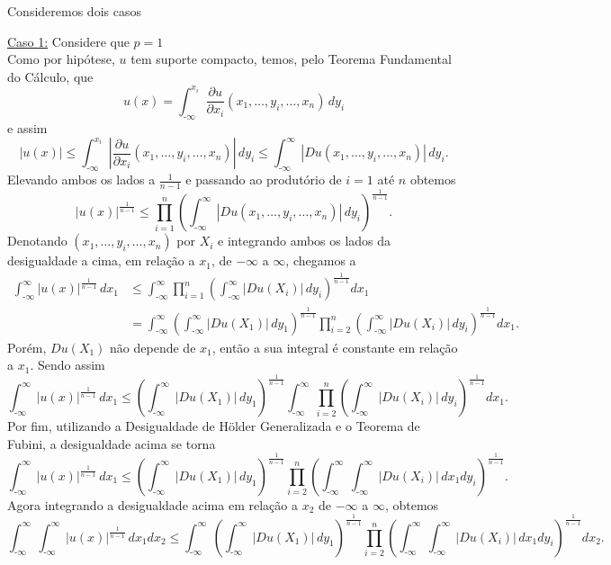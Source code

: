 \documentclass[a4paper, 11pt]{book}
\theoremstyle{definition}
\newcommand{\m}{\text{-}}
\begin{document}
\begin{prf}
    Consideremos dois casos

    \underline{Caso 1:} Considere que $p = 1$\\
    Como por hipótese, $u$ tem suporte compacto, temos, pelo Teorema Fundamental do Cálculo, que
    \[
        u(x) = \int_{\m\infty}^{x_i} \dfrac{\partial u}{\partial x_i}(x_1,\dots,y_i,\dots,x_n) \, dy_i
    \]
    e assim
    \[
        |u(x)| \leqslant \int_{\m\infty}^{x_i} \left|\dfrac{\partial u}{\partial x_i}(x_1,\dots,y_i,\dots,x_n)\right| \, dy_i  \leqslant \int_{\m\infty}^{\infty} \left| Du(x_1,\dots,y_i,\dots,x_n) \right| \,dy_i.
    \]
    Elevando ambos os lados a $\frac{1}{n-1}$ e passando ao produtório de $i = 1$ até $n$ obtemos
    \[
        |u(x)|^{\frac{1}{n-1}} \leqslant \prod_{i=1}^n \left( \int_{\m\infty}^{\infty} |Du(x_1,\dots,y_i,\dots,x_n)| \,dy_i \right)^{\frac{1}{n-1}}.
    \]
    Denotando $(x_1,\dots,y_i,\dots,x_n)$ por $X_i$ e integrando ambos os lados da desigualdade a cima, em relação a $x_1$, de $-\infty$ a $\infty$, chegamos a
    \[
        \begin{aligned}
            \int_{\m\infty}^{\infty} |u(x)|^{\frac{1}{n-1}} \,dx_1 &\leqslant \int_{\m\infty}^{\infty} \prod_{i=1}^n \left( \int_{\m\infty}^{\infty} |Du(X_i)| \,dy_i \right)^{\frac{1}{n-1}}  dx_1\\ 
            &= \int_{\m\infty}^{\infty} \left( \int_{\m\infty}^{\infty} |Du(X_1)| \,dy_1 \right)^{\frac{1}{n-1}}  \prod_{i=2}^n \left(\int_{\m\infty}^{\infty} |Du(X_i)| \, dy_i\right)^{\frac{1}{n-1}} dx_1.
        \end{aligned}
    \]
    Porém, $Du(X_1)$ não depende de $x_1$, então a sua integral é constante em relação a $x_1$. Sendo assim
    \[
        \int_{\m\infty}^{\infty} |u(x)|^{\frac{1}{n-1}} \,dx_1 \leqslant \left( \int_{\m\infty}^{\infty} |Du(X_1)| \,dy_1 \right)^{\frac{1}{n-1}}\int_{\m\infty}^{\infty}   \prod_{i=2}^n \left(\int_{\m\infty}^{\infty} |Du(X_i)| \, dy_i\right)^{\frac{1}{n-1}} dx_1.
    \]
    Por fim, utilizando a Desigualdade de Hölder Generalizada e o Teorema de Fubini, a desigualdade acima se torna
    \[
        \int_{\m\infty}^{\infty} |u(x)|^{\frac{1}{n-1}} \,dx_1 \leqslant \left( \int_{\m\infty}^{\infty} |Du(X_1)| \,dy_1 \right)^{\frac{1}{n-1}}\prod_{i=2}^n \left(\int_{\m\infty}^{\infty}   \int_{\m\infty}^{\infty} |Du(X_i)| \, dx_1dy_i\right)^{\frac{1}{n-1}}.
    \]
    Agora integrando a desigualdade acima em relação a $x_2$ de $-\infty$ a $\infty$, obtemos
    \[
        \int_{\m\infty}^{\infty}\int_{\m\infty}^{\infty} |u(x)|^{\frac{1}{n-1}} \,dx_1dx_2 \leqslant \int_{\m\infty}^{\infty}\!\!\left( \int_{\m\infty}^{\infty} |Du(X_1)| \,dy_1 \right)^{\frac{1}{n-1}}\prod_{i=2}^n \left(\int_{\m\infty}^{\infty} \!\int_{\m\infty}^{\infty} |Du(X_i)| \, dx_1dy_i\right)^{\frac{1}{n-1}} dx_2.
\]
\end{prf}
\end{document}
